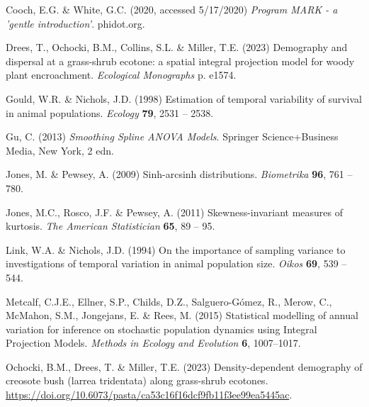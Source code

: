 \documentclass[12pt]{article}
\begin{document}
\begin{spacing}{1.35}
\begin{thebibliography}{62}
		Cooch, E.G. \& White, G.C. (2020, accessed 5/17/2020) \emph{Program MARK - a
			'gentle introduction'}. phidot.org.
			
		Drees, T., Ochocki, B.M., Collins, S.L. \& Miller, T.E. (2023) Demography and
		dispersal at a grass-shrub ecotone: a spatial integral projection model for
		woody plant encroachment. \emph{Ecological Monographs} p. e1574.
		
		Gould, W.R. \& Nichols, J.D. (1998) Estimation of temporal variability of
		survival in animal populations. \emph{Ecology} \textbf{79}, 2531 -- 2538.
		
		Gu, C. (2013) \emph{Smoothing Spline ANOVA Models}. Springer Science+Business
		Media, New York, 2 edn.
		
		Jones, M. \& Pewsey, A. (2009) Sinh-arcsinh distributions. \emph{Biometrika}
		\textbf{96}, 761 -- 780.
		
		Jones, M.C., Rosco, J.F. \& Pewsey, A. (2011) Skewness-invariant measures of
		kurtosis. \emph{The American Statistician} \textbf{65}, 89 -- 95.
		
		Link, W.A. \& Nichols, J.D. (1994) On the importance of sampling variance to
		investigations of temporal variation in animal population size. \emph{Oikos}
		\textbf{69}, 539 -- 544.
		
		Metcalf, C.J.E., Ellner, S.P., Childs, D.Z., Salguero-G{\'o}mez, R., Merow, C.,
		McMahon, S.M., Jongejans, E. \& Rees, M. (2015) {S}tatistical modelling of
		annual variation for inference on stochastic population dynamics using
		{I}ntegral {P}rojection {M}odels. \emph{Methods in Ecology and Evolution}
		\textbf{6}, 1007--1017.
		
		Ochocki, B.M., Drees, T. \& Miller, T.E. (2023) Density-dependent demography of
		creosote bush (larrea tridentata) along grass-shrub ecotones.
		\url{https://doi.org/10.6073/pasta/ca53c16f16dcf9fb11f3ee99ea5445ac}.
		

\end{thebibliography}
\end{spacing}
\end{document}
